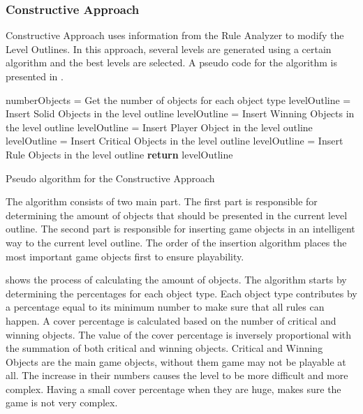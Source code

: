 \subsubsection{Constructive Approach}
Constructive Approach uses information from the Rule Analyzer to modify the Level Outlines. In this approach, several levels are generated using a certain algorithm and the best levels are selected. A pseudo code for the algorithm is presented in .\\

\begin{algorithm}[H]  
	\BlankLine
	numberObjects = Get the number of objects for each object type\;
	\BlankLine
	levelOutline = Insert Solid Objects in the level outline\;
	levelOutline = Insert Winning Objects in the level outline\;
	levelOutline = Insert Player Object in the level outline\;
	levelOutline = Insert Critical Objects in the level outline\;
	levelOutline = Insert Rule Objects in the level outline\;
	\BlankLine
	\textbf{return} levelOutline\;
	\caption{Pseudo algorithm for the Constructive Approach}
	\label{Algorithm:constructiveApproach}
\end{algorithm}
The algorithm consists of two main part. The first part is responsible for determining the amount of objects that should be presented in the current level outline. The second part is responsible for inserting game objects in an intelligent way to the current level outline. The order of the insertion algorithm places the most important game objects first to ensure playability.\\\par

 shows the process of calculating the amount of objects. The algorithm starts by determining the percentages for each object type. Each object type contributes by a percentage equal to its minimum number to make sure that all rules can happen. A cover percentage is calculated based on the number of critical and winning objects. The value of the cover percentage is inversely proportional with the summation of both critical and winning objects. Critical and Winning Objects are the main game objects, without them game may not be playable at all. The increase in their numbers causes the level to be more difficult and more complex. Having a small cover percentage when they are huge, makes sure the game is not very complex.\\

